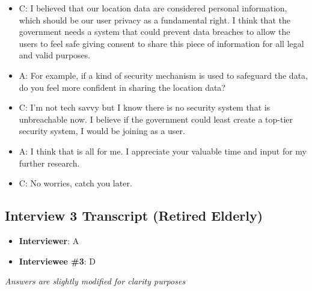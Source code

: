 \begin{appendices}
\begin{itemize}
        \item C: I believed that our location data are considered personal information, which should be our
        user privacy as a fundamental right. I think that the government needs a system that could
        prevent data breaches to allow the users to feel safe giving consent to share this piece of
        information for all legal and valid purposes.
        \item A: For example, if a kind of security mechanism is used to safeguard the data, do you feel more
        confident in sharing the location data?
        \item C: I’m not tech savvy but I know there is no security system that is unbreachable now. I believe
        if the government could least create a top-tier security system, I would be joining as a user.
        \item A: I think that is all for me. I appreciate your valuable time and input for my further research.
        \item C: No worries, catch you later.
      \end{itemize}
  
    \subsection{Interview 3 Transcript (Retired Elderly)}
      \begin{itemize}
        \item \textbf{Interviewer}: A
        \item \textbf{Interviewee \#3}: D
      \end{itemize}
      \par \textit{Answers are slightly modified for clarity purposes}


\end{appendices}
